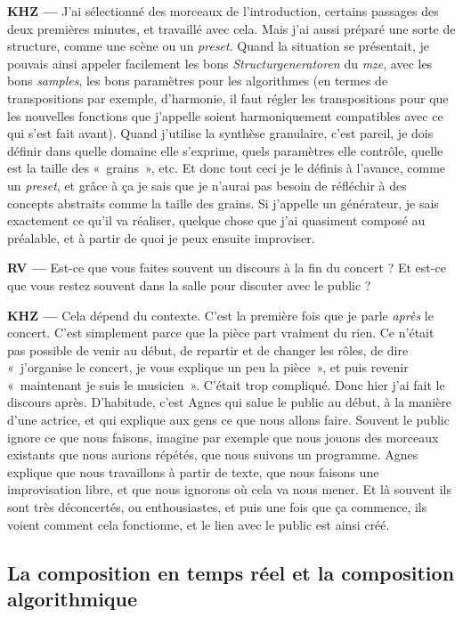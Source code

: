 \documentclass[a4paper,12pt]{article}
\newcommand{\guill}[1]{«~#1~»}
\newcommand{\maze}[0]{\emph{m\symbol{64}ze\textdegree2}}
\begin{document}
\textbf{KHZ ---} J'ai sélectionné des morceaux de l'introduction, certains passages des deux premières minutes, et travaillé avec cela. Mais j'ai aussi préparé une sorte de structure, comme une scène ou un \emph{preset}. Quand la situation se présentait, je pouvais ainsi appeler facilement les bons \emph{Structurgeneratoren} du \maze, avec les bons \emph{samples}, les bons paramètres pour les algorithmes (en termes de transpositions par exemple, d'harmonie, il faut régler les transpositions pour que les nouvelles fonctions que j'appelle soient harmoniquement compatibles avec ce qui s'est fait avant). Quand j'utilise la synthèse granulaire, c'est pareil, je dois définir dans quelle domaine elle s'exprime, quels paramètres elle contrôle, quelle est la taille des \guill{grains}, etc. Et donc tout ceci je le définis à l'avance, comme un \emph{preset}, et grâce à ça je sais que je n'aurai pas besoin de réfléchir à des concepts abstraits comme la taille des grains. Si j'appelle un générateur, je sais exactement ce qu'il va réaliser, quelque chose que j'ai quasiment composé au préalable, et à partir de quoi je peux ensuite improviser.

\textbf{RV ---} Est-ce que vous faites souvent un discours à la fin du concert ? Et est-ce que vous restez souvent dans la salle pour discuter avec le public ?

\textbf{KHZ ---} Cela dépend du contexte. C'est la première fois que je parle \emph{après} le concert. C'est simplement parce que la pièce part vraiment du rien. Ce n'était pas possible de venir au début, de repartir et de changer les rôles, de dire \guill{j'organise le concert, je vous explique un peu la pièce}, et puis revenir \guill{maintenant je suis le musicien}. C'était trop compliqué. Donc hier j'ai fait le discours après. D'habitude, c'est Agnes qui salue le public au début, à la manière d'une actrice, et qui explique aux gens ce que nous allons faire. Souvent le public ignore ce que nous faisons, imagine par exemple que nous jouons des morceaux existants que nous aurions répétés, que nous suivons un programme. Agnes explique que nous travaillons à partir de texte, que nous faisons une improvisation libre, et que nous ignorons où cela va nous mener. Et là souvent ils sont très déconcertés, ou enthousiastes, et puis une fois que ça commence, ils voient comment cela fonctionne, et le lien avec le public est ainsi créé.

\subsection{La composition en temps réel et la composition algorithmique}
\end{document}
